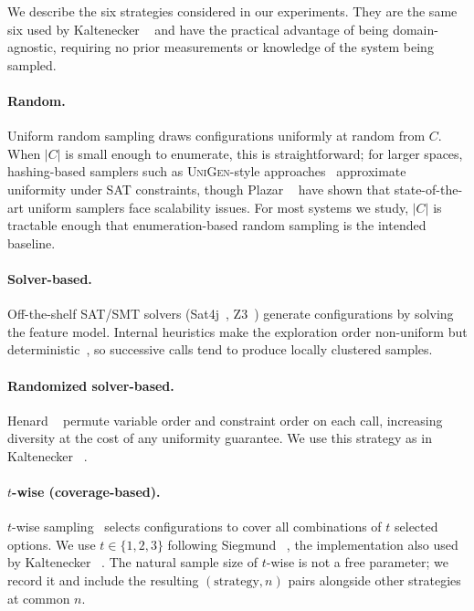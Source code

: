 We describe the six strategies considered in our experiments. They are the same
six used by Kaltenecker \etal~\cite{kaltenecker2019} and have the practical
advantage of being domain-agnostic, requiring no prior measurements or
knowledge of the system being sampled.

\paragraph*{Random.}
Uniform random sampling draws configurations uniformly at random from $C$. When
$|C|$ is small enough to enumerate, this is straightforward; for larger spaces,
hashing-based samplers such as
\textsc{UniGen}-style approaches~\cite{chakraborty2013scalable} approximate uniformity
under SAT constraints, though Plazar \etal~\cite{plazar2019} have shown that
state-of-the-art uniform samplers face scalability issues. For most systems we
study, $|C|$ is tractable enough that enumeration-based random sampling is the
intended baseline.

\paragraph*{Solver-based.}
Off-the-shelf SAT/SMT solvers (Sat4j~\cite{sat4j}, Z3~\cite{Z3}) generate
configurations by solving the feature model. Internal heuristics make the
exploration order non-uniform but
deterministic~\cite{DBLP:journals/tse/HenardPPKHT14}, so successive calls tend
to produce locally clustered samples.

\paragraph*{Randomized solver-based.}
Henard \etal~\cite{DBLP:journals/tse/HenardPPKHT14} permute variable order and
constraint order on each call, increasing diversity at the cost of any
uniformity guarantee. We use this strategy as in
Kaltenecker \etal~\cite{kaltenecker2019}.

\paragraph*{$t$-wise (coverage-based).}
$t$-wise sampling~\cite{Kuhn2004,Cohen2008,Johansen2012} selects configurations
to cover all combinations of $t$ selected options. We use $t\in\{1,2,3\}$
following Siegmund \etal~\cite{siegmund2012a}, the implementation also used by
Kaltenecker \etal~\cite{kaltenecker2019}. The natural sample size of $t$-wise is
not a free parameter; we record it and include the resulting
$(\text{strategy},n)$ pairs alongside other strategies at common $n$.

